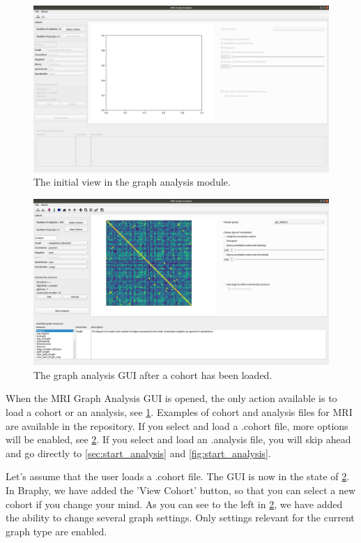 \documentclass{article}
\begin{document}
\begin{figure}[h]
    \centering
    \includegraphics[width=\linewidth]{graph_analysis_locked.png}
    \caption{The initial view in the graph analysis module.}
    \label{fig:locked}
\end{figure}

\begin{figure}[h]
    \centering
    \includegraphics[width=\linewidth]{graph_analysis_cohort.png}
    \caption{The graph analysis GUI after a cohort has been loaded.}
    \label{fig:started}
\end{figure}

When the MRI Graph Analysis GUI is opened, the only action available is to load a cohort or an analysis, see \cref{fig:locked}. Examples of cohort and analysis files for MRI are available in the repository. If you select and load a .cohort file, more options will be enabled, see \cref{fig:started}. If you select and load an .analysis file, you will skip ahead and go directly to \cref{sec:start_analysis} and \cref{fig:start_analysis}.

Let's assume that the user loads a .cohort file. The GUI is now in the state of \cref{fig:started}. In Braphy, we have added the 'View Cohort' button, so that you can select a new cohort if you change your mind. As you can see to the left in \cref{fig:started}, we have added the ability to change several graph settings. Only settings relevant for the current graph type are enabled. 
\end{document}
